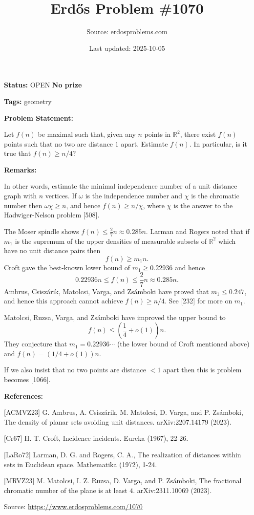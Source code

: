\documentclass{article}
\title{Erd\H{o}s Problem \#1070}
\date{Last updated: 2025-10-05}
\author{Source: erdosproblems.com}
\begin{document}
\maketitle

\noindent\textbf{Status:} OPEN \quad \textbf{No prize}

\noindent\textbf{Tags:} geometry

\medskip
\noindent\textbf{Problem Statement:}

Let $f(n)$ be maximal such that, given any $n$ points in $\mathbb{R}^2$, there exist $f(n)$ points such that no two are distance $1$ apart. Estimate $f(n)$. In particular, is it true that $f(n)\geq n/4$?

\bigskip
\noindent\textbf{Remarks:}

In other words, estimate the minimal independence number of a unit distance graph with $n$ vertices. If $\omega$ is the independence number and $\chi$ is the chromatic number then $\omega \chi\geq n$, and hence $f(n)\geq n/\chi$, where $\chi$ is the answer to the Hadwiger-Nelson problem [508].

The Moser spindle shows $f(n)\leq \frac{2}{7}n\approx 0.285n$. Larman and Rogers \cite{LaRo72} noted that if $m_1$ is the supremum of the upper densities of measurable subsets of $\mathbb{R}^2$ which have no unit distance pairs then\[f(n)\geq m_1n.\]Croft \cite{Cr67} gave the best-known lower bound of $m_1\geq 0.22936$ and hence\[0.22936n \leq f(n) \leq \frac{2}{7}n\approx 0.285n.\]Ambrus, Csisz\'{a}rik, Matolcsi, Varga, and Zs\'{a}mboki \cite{ACMVZ23} have proved that $m_1\leq 0.247$, and hence this approach cannot achieve $f(n)\geq n/4$. See [232] for more on $m_1$. 

Matolcsi, Ruzsa, Varga, and Zs\'{a}mboki \cite{MRVZ23} have improved the upper bound to\[f(n) \leq \left(\frac{1}{4}+o(1)\right)n.\]They conjecture that $m_1=0.22936\cdots$ (the lower bound of Croft mentioned above) and $f(n)=(1/4+o(1))n$.

If we also insist that no two points are distance $<1$ apart then this is problem becomes [1066].

\bigskip
\noindent\textbf{References:}

[ACMVZ23] G. Ambrus, A. Csisz\'{a}rik, M. Matolcsi, D. Varga, and P. Zs\'{a}mboki, The density of planar sets avoiding unit distances. arXiv:2207.14179 (2023).
 
 [Cr67] H. T. Croft, Incidence incidents. Eureka (1967), 22-26.
 
 [LaRo72] Larman, D. G. and Rogers, C. A., The realization of distances within sets in Euclidean space. Mathematika (1972), 1-24.
 
 [MRVZ23] M. Matolcsi, I. Z. Ruzsa, D. Varga, and P. Zs\'{a}mboki, The fractional chromatic number of the plane is at least $4$. arXiv:2311.10069 (2023).

\bigskip
\noindent\small{Source: \url{https://www.erdosproblems.com/1070}}
\end{document}

